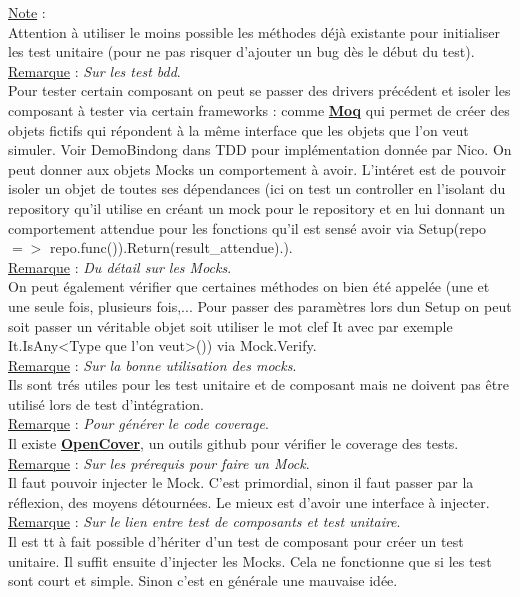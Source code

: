 \documentclass[a4paper,12pt,twoside]{article}
\newcommand{\urlcolor}{magenta}  %
\newcommand{\keycolor}{purple} %
\newcommand{\incode}[1]{{\footnotesize\ttfamily #1}} %
\newcommand{\rem}[2]{\noindent\underline{Remarque} : \textit{#1}.\\ \indent #2}
\newcommand{\note}[1]{\noindent\underline{Note} : \\ \indent #1}
\newcommand{\keyref}[2]{\hypersetup{urlcolor=\keycolor} \href{#1}{\textbf{#2}}\hypersetup{urlcolor=\urlcolor}}
\begin{document}
\note{Attention à utiliser le moins possible les méthodes déjà existante pour initialiser les test unitaire (pour ne pas risquer d'ajouter un bug dès le début du test).}\\

\rem{Sur les test bdd}{Pour tester certain composant on peut se passer des drivers précédent et isoler les composant à tester via certain frameworks : comme \keyref{https://github.com/moq/moq4}{Moq} qui permet de créer des objets fictifs qui répondent à la même interface que les objets que l'on veut simuler. Voir DemoBindong dans TDD pour implémentation donnée par Nico. On peut donner aux objets Mocks un comportement à avoir. L'intéret est de pouvoir isoler un objet de toutes ses dépendances (ici on test un controller en l'isolant du repository qu'il utilise en créant un mock pour le repository et en lui donnant un comportement attendue pour les fonctions qu'il est sensé avoir via \incode{Setup(repo $=>$ repo.func()).Return(result\_attendue)}.).}\\

\rem{Du détail sur les Mocks}{On peut également vérifier que certaines méthodes on bien été appelée (une et une seule fois, plusieurs fois,... Pour passer des paramètres lors dun \incode{Setup} on peut soit passer un véritable objet soit utiliser le mot clef \incode{It} avec par exemple It.IsAny<Type que l'on veut>()) via \incode{Mock.Verify}.}\\

\rem{Sur la bonne utilisation des mocks}{Ils sont trés utiles pour les test unitaire et de composant mais ne doivent pas être utilisé lors de test d'intégration.}\\

\rem{Pour générer le code coverage}{Il existe \keyref{https://github.com/OpenCover/opencover}{OpenCover}, un outils github pour vérifier le coverage des tests.}\\

\rem{Sur les prérequis pour faire un Mock}{Il faut pouvoir injecter le Mock. C'est primordial, sinon il faut passer par la réflexion, des moyens détournées. Le mieux est d'avoir une interface à injecter.}\\

\rem{Sur le lien entre test de composants et test unitaire}{Il est tt à fait possible d'hériter d'un test de composant pour créer un test unitaire. Il suffit ensuite d'injecter les Mocks. Cela ne fonctionne que si les test sont court et simple. Sinon c'est en générale une mauvaise idée.}\\
\end{document}

